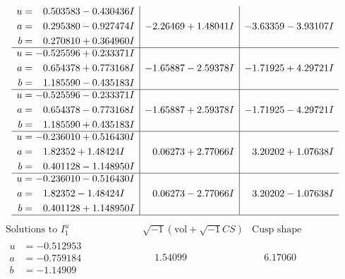 \documentclass[1p]{elsarticle_modified}
\theoremstyle{definition}
\newcommand{\I}{\sqrt{-1}}
\begin{document}
$$\begin{array}{c|c|c}
\begin{aligned}
u &= \phantom{-}0.503583 - 0.430436 I \\
a &= \phantom{-}0.295380 - 0.927474 I \\
b &= \phantom{-}0.270810 + 0.364960 I\end{aligned}
 & -2.26469 + 1.48041 I & -3.63359 - 3.93107 I \\ \hline\begin{aligned}
u &= -0.525596 + 0.233371 I \\
a &= \phantom{-}0.654378 + 0.773168 I \\
b &= \phantom{-}1.185590 - 0.435183 I\end{aligned}
 & -1.65887 - 2.59378 I & -1.71925 + 4.29721 I \\ \hline\begin{aligned}
u &= -0.525596 - 0.233371 I \\
a &= \phantom{-}0.654378 - 0.773168 I \\
b &= \phantom{-}1.185590 + 0.435183 I\end{aligned}
 & -1.65887 + 2.59378 I & -1.71925 - 4.29721 I \\ \hline\begin{aligned}
u &= -0.236010 + 0.516430 I \\
a &= \phantom{-}1.82352 + 1.48424 I \\
b &= \phantom{-}0.401128 - 1.148950 I\end{aligned}
 & \phantom{-}0.06273 + 2.77066 I & \phantom{-}3.20202 + 1.07638 I \\ \hline\begin{aligned}
u &= -0.236010 - 0.516430 I \\
a &= \phantom{-}1.82352 - 1.48424 I \\
b &= \phantom{-}0.401128 + 1.148950 I\end{aligned}
 & \phantom{-}0.06273 - 2.77066 I & \phantom{-}3.20202 - 1.07638 I\\
 \hline 
 \end{array}$$\newpage$$\begin{array}{c|c|c}  
\text{Solutions to }I^u_{1}& \I (\text{vol} + \sqrt{-1}CS) & \text{Cusp shape}\\
 \hline 
\begin{aligned}
u &= -0.512953\phantom{ +0.000000I} \\
a &= -0.759184\phantom{ +0.000000I} \\
b &= -1.14909\phantom{ +0.000000I}\end{aligned}
 & \phantom{-}1.54099\phantom{ +0.000000I} & \phantom{-}6.17060\phantom{ +0.000000I} \\ \hline\begin{aligned}

\end{aligned}
\end{array}$$
\end{document}
